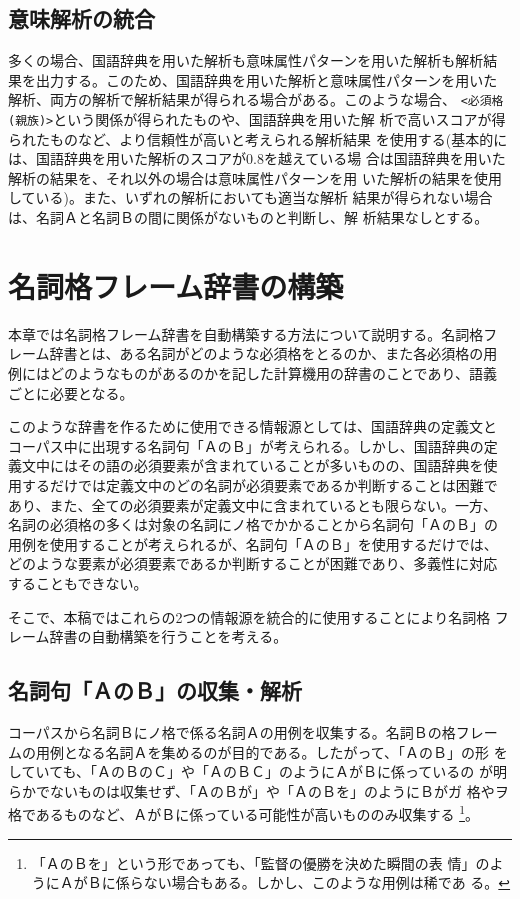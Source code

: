 \documentclass{nlp}
\begin{document}
  \subsection{意味解析の統合}

  多くの場合、国語辞典を用いた解析も意味属性パターンを用いた解析も解析結
  果を出力する。このため、国語辞典を用いた解析と意味属性パターンを用いた
  解析、両方の解析で解析結果が得られる場合がある。このような場合、
  \texttt{<必須格(親族)>}という関係が得られたものや、国語辞典を用いた解
  析で高いスコアが得られたものなど、より信頼性が高いと考えられる解析結果
  を使用する(基本的には、国語辞典を用いた解析のスコアが0.8を越えている場
  合は国語辞典を用いた解析の結果を、それ以外の場合は意味属性パターンを用
  いた解析の結果を使用している)。また、いずれの解析においても適当な解析
  結果が得られない場合は、名詞Ａと名詞Ｂの間に関係がないものと判断し、解
  析結果なしとする。
  
 \section{名詞格フレーム辞書の構築}
  
  本章では名詞格フレーム辞書を自動構築する方法について説明する。名詞格フ
  レーム辞書とは、ある名詞がどのような必須格をとるのか、また各必須格の用
  例にはどのようなものがあるのかを記した計算機用の辞書のことであり、語義
  ごとに必要となる。
  
  このような辞書を作るために使用できる情報源としては、国語辞典の定義文と
  コーパス中に出現する名詞句「ＡのＢ」が考えられる。しかし、国語辞典の定
  義文中にはその語の必須要素が含まれていることが多いものの、国語辞典を使
  用するだけでは定義文中のどの名詞が必須要素であるか判断することは困難で
  あり、また、全ての必須要素が定義文中に含まれているとも限らない。一方、
  名詞の必須格の多くは対象の名詞にノ格でかかることから名詞句「ＡのＢ」の
  用例を使用することが考えられるが、名詞句「ＡのＢ」を使用するだけでは、
  どのような要素が必須要素であるか判断することが困難であり、多義性に対応
  することもできない。

  そこで、本稿ではこれらの2つの情報源を統合的に使用することにより名詞格
  フレーム辞書の自動構築を行うことを考える。

  \subsection{名詞句「ＡのＢ」の収集・解析}
  \label{収集}

  コーパスから名詞Ｂにノ格で係る名詞Ａの用例を収集する。名詞Ｂの格フレー
  ムの用例となる名詞Ａを集めるのが目的である。したがって、「ＡのＢ」の形
  をしていても、「ＡのＢのＣ」や「ＡのＢＣ」のようにＡがＢに係っているの
  が明らかでないものは収集せず、「ＡのＢが」や「ＡのＢを」のようにＢがガ
  格やヲ格であるものなど、ＡがＢに係っている可能性が高いもののみ収集する
  \footnote{「ＡのＢを」という形であっても、「監督の優勝を決めた瞬間の表
  情」のようにＡがＢに係らない場合もある。しかし、このような用例は稀であ
  る。}。
\end{document}
